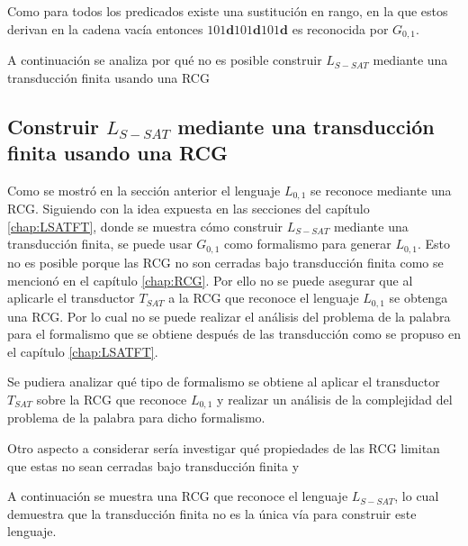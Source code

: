 \documentclass[12pt]{article}
\begin{document}
Como para todos los predicados existe una sustitución en rango, en la que estos derivan en la cadena vacía
entonces $101\mathbf{d}101\mathbf{d}101\mathbf{d}$ es reconocida por $G_{0,1}$.

A continuación se analiza por qué no es posible construir $L_{S-SAT}$ mediante una transducción finita usando
una RCG

\subsection{Construir $L_{S-SAT}$ mediante una transducción finita usando una RCG}

Como se mostró en la sección anterior el lenguaje $L_{0,1}$ se reconoce mediante una RCG.  Siguiendo con la
idea expuesta en las secciones del capítulo \ref{chap:LSATFT}, donde se muestra cómo construir $L_{S-SAT}$
mediante una transducción finita, se puede usar $G_{0,1}$ como formalismo para generar $L_{0,1}$.
Esto no es posible porque las RCG no son cerradas bajo transducción finita como se mencionó en el
capítulo \ref{chap:RCG}.  Por ello no se puede asegurar que al aplicarle el transductor $T_{SAT}$ a
la RCG que reconoce el lenguaje $L_{0,1}$ se obtenga una RCG. Por lo cual no se puede realizar el
análisis del problema de la palabra para el formalismo que se obtiene después de las transducción
como se propuso en el capítulo \ref{chap:LSATFT}.

Se pudiera analizar qué tipo de formalismo se obtiene al aplicar el transductor $T_{SAT}$ sobre
la RCG que reconoce $L_{0,1}$ y realizar un análisis de la complejidad del problema de la palabra
para dicho formalismo.

Otro aspecto a considerar sería investigar qué propiedades de las RCG limitan que estas no sean cerradas bajo transducción finita y 

A continuación se muestra una RCG que reconoce el lenguaje $L_{S-SAT}$, lo cual demuestra que la transducción
finita no es la única vía para construir este lenguaje.
\end{document}
